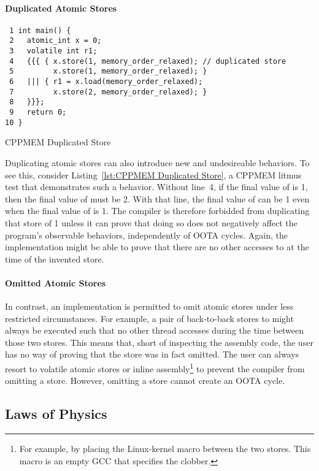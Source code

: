 \documentclass[10]{article}
\begin{document}
\paragraph{Duplicated Atomic Stores}

\begin{listing}[tbp]
\begin{verbatim}
 1 int main() {
 2   atomic_int x = 0;
 3   volatile int r1;
 4   {{{ { x.store(1, memory_order_relaxed); // duplicated store
 5         x.store(1, memory_order_relaxed); }
 6   ||| { r1 = x.load(memory_order_relaxed);
 7         x.store(2, memory_order_relaxed); }
 8   }}};
 9   return 0;
10 }
\end{verbatim}
\caption{CPPMEM Duplicated Store}
\label{lst:CPPMEM Duplicated Store}
\end{listing}

Duplicating atomic stores can also introduce new and undesireable
behaviors.
To see this, consider Listing~\ref{lst:CPPMEM Duplicated Store}, a CPPMEM
litmus test that demonstrates such a behavior.
Without line~4, if the final value of  is 1, then the final value
of  must be 2.
With that line, the final value of  can be 1 even when the
final value of  is 1.
The compiler is therefore forbidded from duplicating that store of 1
unless it can prove that doing so does not negatively affect the
program's observable behaviors, independently of OOTA cycles.
Again, the implementation might be able to prove that there
are no other accesses to  at the time of the invented store.

\paragraph{Omitted Atomic Stores}
In contrast, an implementation is permitted to omit atomic stores
under less restricted circumstances.
For example, a pair of back-to-back stores to  might always be
executed such that no other thread accesses  during the time
between those two stores.
This means that, short of inspecting the assembly code, the user has no
way of proving that the store was in fact omitted.
The user can always resort to volatile atomic stores or inline
assembly\footnote{
	For example, by placing the Linux-kernel  macro
	between the two stores.
	This macro is an empty GCC  that specifies the 
	clobber.}
to prevent the compiler from omitting a store.
However, omitting a store cannot create an OOTA cycle.

\subsection{Laws of Physics}
\label{sec:Laws of Physics}
\end{document}
